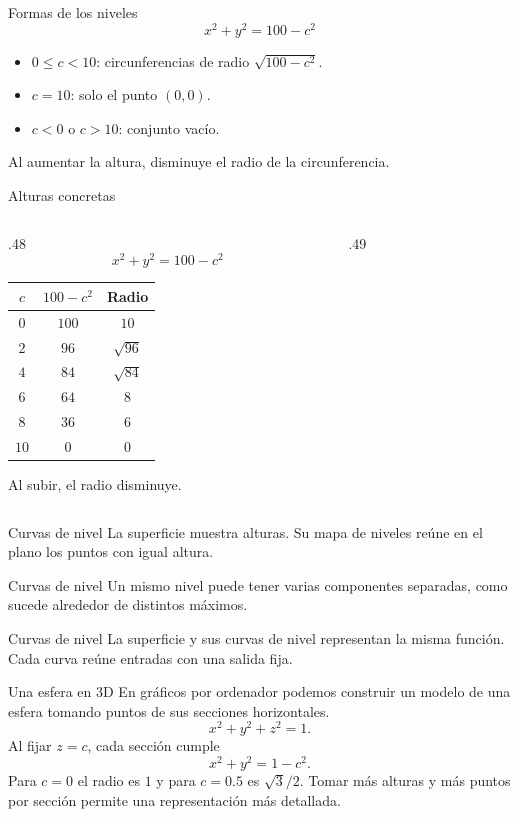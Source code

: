 \begin{frame}{Formas de los niveles}
\[x^2+y^2=100-c^2\]
\begin{itemize}
\item $0\le c<10$: circunferencias de radio $\sqrt{100-c^2}$.
\item $c=10$: solo el punto $(0,0)$.
\item $c<0$ o $c>10$: conjunto vacío.
\end{itemize}
Al aumentar la altura, disminuye el radio de la circunferencia.
\end{frame}
\begin{frame}{Alturas concretas}
\begin{columns}[c]
\begin{column}{.48\textwidth}
\[x^2+y^2=100-c^2\]
\begin{center}\begin{tabular}{ccc}
$c$ & $100-c^2$ & Radio\\\hline
$0$ & $100$ & $10$\\[2mm]
$2$ & $96$ & $\sqrt{96}$\\[2mm]
$4$ & $84$ & $\sqrt{84}$\\[2mm]
$6$ & $64$ & $8$\\[2mm]
$8$ & $36$ & $6$\\[2mm]
$10$ & $0$ & $0$
\end{tabular}\end{center}
Al subir, el radio disminuye.
\end{column}
\begin{column}{.49\textwidth}\end{column}
\end{columns}
\end{frame}
\begin{frame}{Curvas de nivel}
La superficie muestra alturas. Su mapa de niveles reúne en el plano los puntos con igual altura.
\end{frame}
\begin{frame}{Curvas de nivel}
Un mismo nivel puede tener varias componentes separadas, como sucede alrededor de distintos máximos.
\end{frame}
\begin{frame}{Curvas de nivel}
La superficie y sus curvas de nivel representan la misma función. Cada curva reúne entradas con una salida fija.
\end{frame}
\begin{frame}{Una esfera en 3D}
En gráficos por ordenador podemos construir un modelo de una esfera tomando puntos de sus secciones horizontales.
\[x^2+y^2+z^2=1.\]
Al fijar $z=c$, cada sección cumple
\[x^2+y^2=1-c^2.\]
Para $c=0$ el radio es $1$ y para $c=0.5$ es $\sqrt3/2$.
\medskip
Tomar más alturas y más puntos por sección permite una representación más detallada.
\end{frame}
